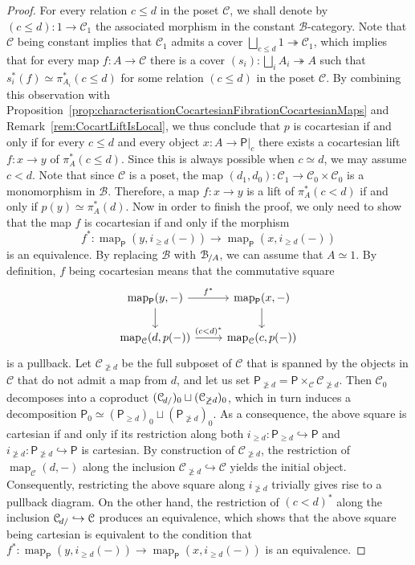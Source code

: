 \documentclass[reqno]{amsart}
\numberwithin{equation}{subsection}
\theoremstyle{plain}
\theoremstyle{definition}
\let\scr=\mathcal
\let\into=\hookrightarrow
\let\onto=\twoheadrightarrow
\def\BB{\scr B}
\def\CC{\scr C}
\DeclareMathOperator{\Map}{map}
\newcommand{\map}[1]{\Map_{#1}}
\newcommand{\Over}[2]{#1_{\hspace{-1pt}/#2}}
\newcommand{\Under}[2]{#1_{\hspace{-1pt}#2/}}
\newcommand{\I}[1]{\mathsf{#1}}
\begin{document}
\begin{proof}
	For every relation $c\leq d$ in the poset $\CC$, we shall denote by $(c\leq d)\colon 1\to\CC_1$ the associated morphism in the constant $\BB$-category. Note that $\CC$ being constant implies that $\CC_1$ admits a cover $\bigsqcup_{c\leq d} 1\onto \CC_1$, which implies that for every map $f\colon A\to \CC$ there is a cover $(s_i)\colon \bigsqcup_i A_i\onto A$ such that $s_i^\ast(f)\simeq\pi_{A_i}^\ast(c\leq d)$ for some relation $(c \leq d)$ in the poset $\CC$.
	 By combining this observation with Proposition~\ref{prop:characterisationCocartesianFibrationCocartesianMaps} and Remark~\ref{rem:CocartLiftIsLocal}, we thus conclude that $p$ is cocartesian if and only if for every $c\leq d$ and every object $x\colon A\to \I{P}\vert_c$ there exists a cocartesian lift $f\colon x\to y$ of $\pi_A^\ast(c\leq d)$. Since this is always possible when $c\simeq d$, we may assume $c<d$. Note that since $\CC$ is a poset, the map $(d_1,d_0)\colon\CC_1\to\CC_0\times\CC_0$ is a monomorphism in $\BB$. Therefore, a map $f\colon x\to y$ is a lift of $\pi_A^\ast(c< d)$ if and only if $p(y)\simeq \pi_A^\ast(d)$. Now in order to finish the proof, we only need to show that the map $f$ is cocartesian if and only if the morphism
	\begin{equation*}
	f^\ast\colon \map{\I{P}}(y,i_{\geq d}(-))\to\map{\I{P}}(x,i_{\geq d}(-))
	\end{equation*}
	is an equivalence. By replacing $\BB$ with $\Over{\BB}{A}$, we can assume that $A\simeq 1$. By definition, $f$ being cocartesian means that the commutative square
	\begin{equation*}
		\begin{tikzcd}
		\map{\I{P}}(y,-)\arrow[r, "f^\ast"]\arrow[d] & \map{\I{P}}(x,-)\arrow[d]\\
		\map{\CC}(d,p(-))\arrow[r, "(c< d)^\ast"] & \map{\CC}(c,p(-))
		\end{tikzcd}
	\end{equation*}
	is a pullback. Let $\CC_{\not\geq d}$ be the full subposet of $\CC$ that is spanned by the objects in $\CC$ that do not admit a map from $d$, and let us set $\I{P}_{\not\geq d}=\I{P}\times_{\CC}\CC_{\not\geq d}$. Then $\CC_0$ decomposes into a coproduct $(\Under{\CC}{d})_0\sqcup(\CC_{\not\geq d})_0$, which in turn induces a decomposition $\I{P}_0\simeq(\I{P}_{\geq d})_0\sqcup(\I{P}_{\not\geq d})_0$. As a consequence, the above square is cartesian if and only if its restriction along both $i_{\geq d}\colon \I{P}_{\geq d}\into\I{P}$ and $i_{\not\geq d}\colon\I{P}_{\not\geq d}\into\I{P}$ is cartesian. By construction of $\CC_{\not\geq d}$, the restriction of $\map{\CC}(d,-)$ along the inclusion $\CC_{\not\geq d}\into\CC$ yields the initial object. Consequently, restricting the above square along $i_{\not\geq d}$ trivially gives rise to a pullback diagram. On the other hand, the restriction of $(c<d)^\ast$ along the inclusion $\Under{\CC}{d}\into\CC$ produces an equivalence, which shows that the above square being cartesian is equivalent to the condition that $f^\ast\colon \map{\I{P}}(y,i_{\geq d}(-))\to\map{\I{P}}(x,i_{\geq d}(-))$ is an equivalence.
\end{proof}
\end{document}
